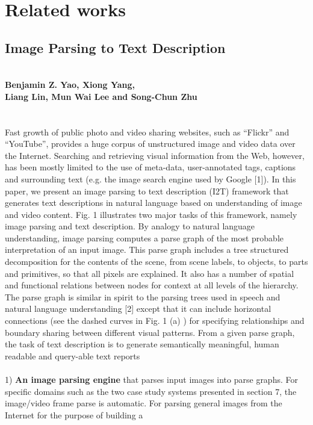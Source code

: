 \documentclass{article}
\begin{document}
\section{Related works}

\subsection{Image Parsing to Text Description}
\textbf{\small \\Benjamin Z. Yao, Xiong Yang, \\Liang Lin, Mun Wai Lee and Song-Chun Zhu}
\\\\\\
Fast growth of public photo and video sharing websites,
such as “Flickr” and “YouTube”, provides a huge
corpus of unstructured image and video data over the
Internet. Searching and retrieving visual information
from the Web, however, has been mostly limited to
the use of meta-data, user-annotated tags, captions and
surrounding text (e.g. the image search engine used by
Google [1]). In this paper, we present an image parsing
to text description (I2T) framework that generates text
descriptions in natural language based on understanding
of image and video content. Fig. 1 illustrates two
major tasks of this framework, namely image parsing
and text description. By analogy to natural language
understanding, image parsing computes a parse graph of
the most probable interpretation of an input image. This
parse graph includes a tree structured decomposition for
the contents of the scene, from scene labels, to objects,
to parts and primitives, so that all pixels are explained.
It also has a number of spatial and functional relations
between nodes for context at all levels of the hierarchy.
The parse graph is similar in spirit to the parsing trees
used in speech and natural language understanding [2]
except that it can include horizontal connections (see the
dashed curves in Fig. 1 (a) ) for specifying relationships
and boundary sharing between different visual patterns.
From a given parse graph, the task of text description
is to generate semantically meaningful, human readable
and query-able text reports\\\\
1) \textbf{An image parsing engine} that parses input images
into parse graphs. For specific domains such as the
two case study systems presented in section 7, the image/video
frame parse is automatic. For parsing general
images from the Internet for the purpose of building a
\end{document}
